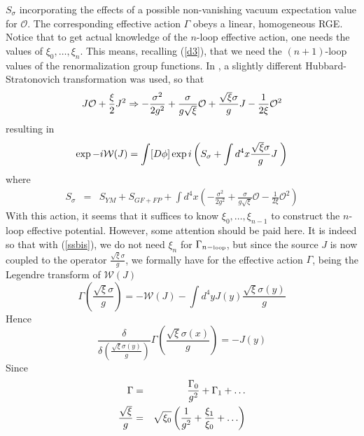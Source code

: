\documentclass[a4paper,12pt]{article}
\newcommand{\text}{\textrm}
\begin{document}
$S_{\sigma}$ incorporating the effects of a possible non-vanishing vacuum
expectation value for $\mathcal{O}$. The corresponding effective action $%
\Gamma$ obeys a linear, homogeneous RGE. Notice that to get actual knowledge
of the $n$-loop effective action, one needs the values of $\xi_{0}, \ldots,
\xi_{n}$. This means, recalling (\ref{d3}), that we need the $(n+1)$-loop
values of the renormalization group functions. In \cite{Lemes:2002rc}, a
slightly different Hubbard-Stratonovich transformation was used, so that
\begin{equation}
J\mathcal{O}+\frac{\xi }{2}J^{2}\Rightarrow -\frac{\sigma ^{2}}{2 g^{2}}+%
\frac{\sigma }{g\sqrt{\xi}}\mathcal{O}+\frac{\sqrt{\xi}\sigma }{g}J-\frac{1}{%
2\xi }\mathcal{O}^{2}  \label{hsbis}
\end{equation}
resulting in
\begin{equation}
\exp -i\mathcal{W}(J)=\int [D\phi ]\exp i\left( S_{\sigma }+\int d^{4}x\frac{%
\sqrt{\xi}\sigma }{g}J\;\right)  \label{wjsbis}
\end{equation}
where
\begin{eqnarray}
S_{\sigma } &=&S_{YM}+S_{GF+FP}+\int d^{4}x\left( -\frac{\sigma ^{2}}{2g^{2}}%
+\frac{\sigma }{g\sqrt{\xi}}\mathcal{O}-\frac{1}{2\xi }\mathcal{O}
^{2}\right)  \label{ssbis}
\end{eqnarray}
With this action, it seems that it suffices to know $\xi_{0},\ldots,\xi_{n-1}
$ to construct the $n$-loop effective potential. However, some attention
should be paid here. It is indeed so that with (\ref{ssbis}), we do not need
$\xi_{n}$ for $\Gamma_{n-\text{{\tiny {loop}}}}$, but since the source $J$
is now coupled to the operator $\frac{\sqrt{\xi}\sigma}{g}$, we formally
have for the effective action $\Gamma$, being the Legendre transform of $%
\mathcal{W}(J)$
\begin{equation}  \label{dudal2}
\Gamma\left(\frac{\sqrt{\xi}\sigma}{g}\right)=-\mathcal{W}(J)-\int d^{4}y
J(y)\frac{\sqrt{\xi}\sigma(y)}{g}
\end{equation}
Hence
\begin{equation}  \label{dudal3}
\frac{\delta}{\delta\left(\frac{\sqrt{\xi}\sigma(y)}{g}\right)}\Gamma\left(%
\frac{\sqrt{\xi}\sigma(x)}{g}\right)=-J(y)
\end{equation}
Since
\begin{eqnarray}
\Gamma &=& \frac{\Gamma_{0}}{g^{2}}+\Gamma_{1}+\ldots \\
\frac{\sqrt{\xi}}{g} &=& \sqrt{\xi_{0}}\left(\frac{1}{g^{2}}+\frac{\xi_{1}}{%
\xi_{0}}+\ldots\right)
\end{eqnarray}
\end{document}
